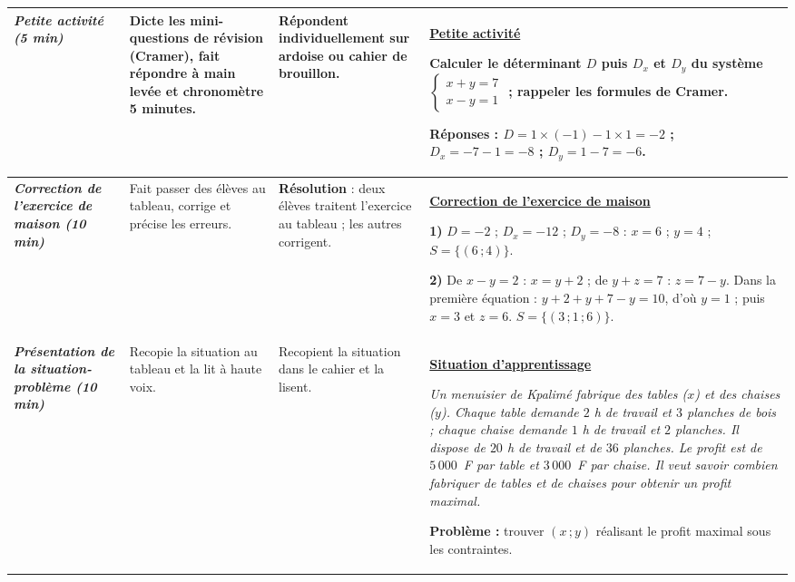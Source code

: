 \documentclass[10pt]{article}
\newcommand{\titreR}[1]{\underline{\textcolor{rougetitre}{\bfseries #1}}}
\newcommand{\seance}[1]{\fcolorbox{bleuseance}{bleufond}{\textcolor{bleuseance}{\bfseries #1}}}
\newcommand{\moment}[1]{\textbf{\itshape #1}}
\begin{document}
\begin{longtable}{|p{2.35cm}|p{5.35cm}|p{4.55cm}|p{13.85cm}|}
\hline
\seance{SEANCE 2} \newline \moment{Petite activité (5 min)} &
Dicte les mini-questions de révision (Cramer), fait répondre à main levée et
chronomètre 5 minutes. &
Répondent individuellement sur ardoise ou cahier de brouillon. &
\titreR{Petite activité} \par
Calculer le déterminant $D$ puis $D_x$ et $D_y$ du système
$\left\{\begin{array}{l}x+y=7 \\ x-y=1\end{array}\right.$ ; rappeler les formules de Cramer. \par
\textbf{Réponses :} $D=1\times(-1)-1\times1=-2$ ; $D_x=-7-1=-8$ ; $D_y=1-7=-6$. \\ \hline

\moment{Correction de l'exercice de maison (10 min)} &
Fait passer des élèves au tableau, corrige et précise les erreurs. &
\textbf{Résolution} : deux élèves traitent l'exercice au tableau ; les autres corrigent. &
\titreR{Correction de l'exercice de maison} \par
\textbf{1)} $D=-2$ ; $D_x=-12$ ; $D_y=-8$ : $x=6$ ; $y=4$ ; $S=\{(6\,;4)\}$. \par
\textbf{2)} De $x-y=2$ : $x=y+2$ ; de $y+z=7$ : $z=7-y$. Dans la première équation :
$y+2+y+7-y=10$, d'où $y=1$ ; puis $x=3$ et $z=6$. \;
$S=\{(3\,;1\,;6)\}$. \\ \hline

\moment{Présentation de la situation-problème (10 min)} &
Recopie la situation au tableau et la lit à haute voix. &
Recopient la situation dans le cahier et la lisent. &
\titreR{Situation d'apprentissage} \par
{\itshape Un menuisier de Kpalimé fabrique des tables ($x$) et des chaises ($y$).
Chaque table demande $2$ h de travail et $3$ planches de bois ; chaque chaise demande
$1$ h de travail et $2$ planches. Il dispose de $20$ h de travail et de $36$ planches.
Le profit est de $5\,000$~F par table et $3\,000$~F par chaise. Il veut savoir combien
fabriquer de tables et de chaises pour obtenir un profit maximal.} \par
\textbf{Problème :} trouver $(x\,;y)$ réalisant le profit maximal sous les contraintes. \\ \hline


\end{longtable}
\end{document}
